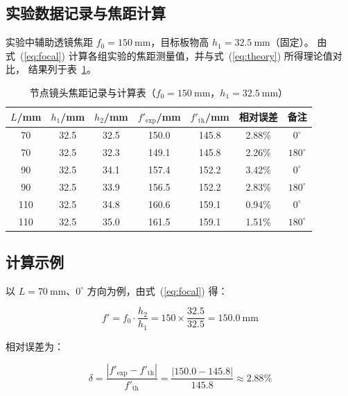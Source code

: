\documentclass[12pt, a4paper]{article}
\begin{document}
\subsection{实验数据记录与焦距计算}

实验中辅助透镜焦距 $f_0 = 150\ \mathrm{mm}$，目标板物高 $h_1 = 32.5\ \mathrm{mm}$（固定）。
由式~(\ref{eq:focal}) 计算各组实验的焦距测量值，并与式~(\ref{eq:theory}) 所得理论值对比，
结果列于表~\ref{tab:data}。

\begin{table}[H]
  \centering
  \caption{节点镜头焦距记录与计算表（$f_0 = 150\ \mathrm{mm}$，$h_1 = 32.5\ \mathrm{mm}$）}
  \label{tab:data}
  \begin{tabular}{ccccccc}
    \toprule
    $L$/mm & $h_1$/mm & $h_2$/mm &
    $f'_{\mathrm{exp}}$/mm & $f'_{\mathrm{th}}$/mm & 相对误差 & 备注 \\
    \midrule
    70  & 32.5 & 32.5 & 150.0 & 145.8 & 2.88\% & $0^\circ$   \\
    70  & 32.5 & 32.3 & 149.1 & 145.8 & 2.26\% & $180^\circ$ \\
    90  & 32.5 & 34.1 & 157.4 & 152.2 & 3.42\% & $0^\circ$   \\
    90  & 32.5 & 33.9 & 156.5 & 152.2 & 2.83\% & $180^\circ$ \\
    110 & 32.5 & 34.8 & 160.6 & 159.1 & 0.94\% & $0^\circ$   \\
    110 & 32.5 & 35.0 & 161.5 & 159.1 & 1.51\% & $180^\circ$ \\
    \bottomrule
  \end{tabular}
\end{table}

\subsection{计算示例}

以 $L = 70\ \mathrm{mm}$、$0^\circ$ 方向为例，由式~(\ref{eq:focal}) 得：

\begin{equation}
  f' = f_0 \cdot \frac{h_2}{h_1} = 150 \times \frac{32.5}{32.5} = 150.0\ \mathrm{mm}
\end{equation}

相对误差为：

\begin{equation}
  \delta = \frac{|f'_{\mathrm{exp}} - f'_{\mathrm{th}}|}{f'_{\mathrm{th}}}
         = \frac{|150.0 - 145.8|}{145.8} \approx 2.88\%
\end{equation}
\end{document}

